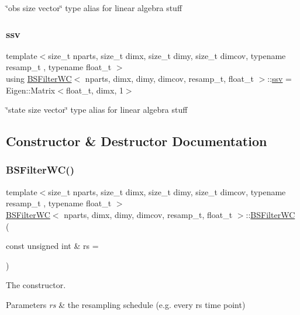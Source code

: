 \char`\"{}obs size vector\char`\"{} type alias for linear algebra stuff \mbox{\label{classBSFilterWC_afff292a8cc15505cc3aa244135203c78}} 
\subsubsection{\texorpdfstring{ssv}{ssv}}
{\footnotesize\ttfamily template$<$size\+\_\+t nparts, size\+\_\+t dimx, size\+\_\+t dimy, size\+\_\+t dimcov, typename resamp\+\_\+t , typename float\+\_\+t $>$ \\
using \hyperlink{classBSFilterWC}{B\+S\+Filter\+WC}$<$ nparts, dimx, dimy, dimcov, resamp\+\_\+t, float\+\_\+t $>$\+::\hyperlink{classBSFilterWC_afff292a8cc15505cc3aa244135203c78}{ssv} =  Eigen\+::\+Matrix$<$float\+\_\+t, dimx, 1$>$}

\char`\"{}state size vector\char`\"{} type alias for linear algebra stuff 

\subsection{Constructor \& Destructor Documentation}
\mbox{\label{classBSFilterWC_a8b9399d0b7008aa6bca19a87834dfd6a}} 
\subsubsection{\texorpdfstring{B\+S\+Filter\+W\+C()}{BSFilterWC()}}
{\footnotesize\ttfamily template$<$size\+\_\+t nparts, size\+\_\+t dimx, size\+\_\+t dimy, size\+\_\+t dimcov, typename resamp\+\_\+t , typename float\+\_\+t $>$ \\
\hyperlink{classBSFilterWC}{B\+S\+Filter\+WC}$<$ nparts, dimx, dimy, dimcov, resamp\+\_\+t, float\+\_\+t $>$\+::\hyperlink{classBSFilterWC}{B\+S\+Filter\+WC} (\begin{DoxyParamCaption}\item[{const unsigned int \&}]{rs = {} }\end{DoxyParamCaption})}



The constructor. 


\begin{DoxyParams}{Parameters}
{\em rs} & the resampling schedule (e.\+g. every rs time point) \\
\hline
\end{DoxyParams}


